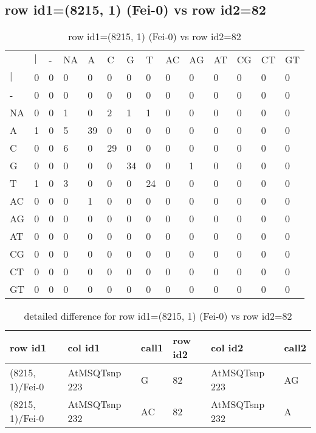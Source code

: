 \subsection{row id1=(8215, 1) (Fei-0) vs row id2=82}
\begin{center}
\begin{longtable}{|l|l|l|l|l|l|l|l|l|l|l|l|l|l|}
\caption{row id1=(8215, 1) (Fei-0) vs row id2=82} \label{table_dm348}\\
\hline
\\
\hline
&$|$&-&NA&A&C&G&T&AC&AG&AT&CG&CT&GT\\
$|$&0&0&0&0&0&0&0&0&0&0&0&0&0\\
-&0&0&0&0&0&0&0&0&0&0&0&0&0\\
NA&0&0&1&0&2&1&1&0&0&0&0&0&0\\
A&1&0&5&39&0&0&0&0&0&0&0&0&0\\
C&0&0&6&0&29&0&0&0&0&0&0&0&0\\
G&0&0&0&0&0&34&0&0&1&0&0&0&0\\
T&1&0&3&0&0&0&24&0&0&0&0&0&0\\
AC&0&0&0&1&0&0&0&0&0&0&0&0&0\\
AG&0&0&0&0&0&0&0&0&0&0&0&0&0\\
AT&0&0&0&0&0&0&0&0&0&0&0&0&0\\
CG&0&0&0&0&0&0&0&0&0&0&0&0&0\\
CT&0&0&0&0&0&0&0&0&0&0&0&0&0\\
GT&0&0&0&0&0&0&0&0&0&0&0&0&0\\
\hline
\end{longtable}
\end{center}

\begin{center}
\begin{longtable}{|l|l|l|l|l|l|}
\caption{detailed difference for row id1=(8215, 1) (Fei-0) vs row id2=82} \label{table_dm349}\\
\hline
row id1&col id1&call1&row id2&col id2&call2\\
\hline
(8215, 1)/Fei-0&AtMSQTsnp 223&G&82&AtMSQTsnp 223&AG\\
(8215, 1)/Fei-0&AtMSQTsnp 232&AC&82&AtMSQTsnp 232&A\\
\hline
\end{longtable}
\end{center}

